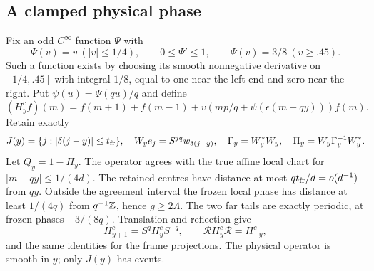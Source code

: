 \subsection{A clamped physical phase}
Fix an odd $C^\infty$ function $\Psi$ with
\[
 \Psi(v)=v\ (|v|\le1/4),\qquad 0\le\Psi'\le1,\qquad
 \Psi(v)=3/8\ (v\ge .45).
\]
Such a function exists by choosing its smooth nonnegative derivative on $[1/4,.45]$ with integral $1/8$, equal to one near the left end and zero near the right. Put $\psi(u)=\Psi(qu)/q$ and define
\begin{equation}\label{eq:continuation}
 (H_y^cf)(m)=f(m+1)+f(m-1)
 +v\!\left(mp/q+\psi(\epsilon(m-qy))\right)f(m).
\end{equation}
Retain exactly
\[
 J(y)=\{j:|\delta(j-y)|\le t_{\rm fr}\},\quad
 W_y e_j=S^{jq}w_{\delta(j-y)},\quad
 \Gamma_y=W_y^*W_y,\quad \Pi_y=W_y\Gamma_y^{-1}W_y^*.
\]
Let $Q_y=1-\Pi_y$. The operator agrees with the true affine local chart for
$|m-qy|\le1/(4d)$. The retained centres have distance at most
$qt_{\rm fr}/d=o(d^{-1})$ from $qy$. Outside the agreement interval the frozen local phase has distance at least $1/(4q)$ from $q^{-1}\mathbb Z$, hence $g\ge2\Lambda$. The two far tails are exactly periodic, at frozen phases $\pm3/(8q)$. Translation and reflection give
\begin{equation}\label{eq:belowcovphysical}
 H^c_{y+1}=S^qH^c_yS^{-q},\qquad
 \mathcal RH^c_y\mathcal R=H^c_{-y},
\end{equation}
and the same identities for the frame projections. The physical operator is smooth in $y$; only $J(y)$ has events.


